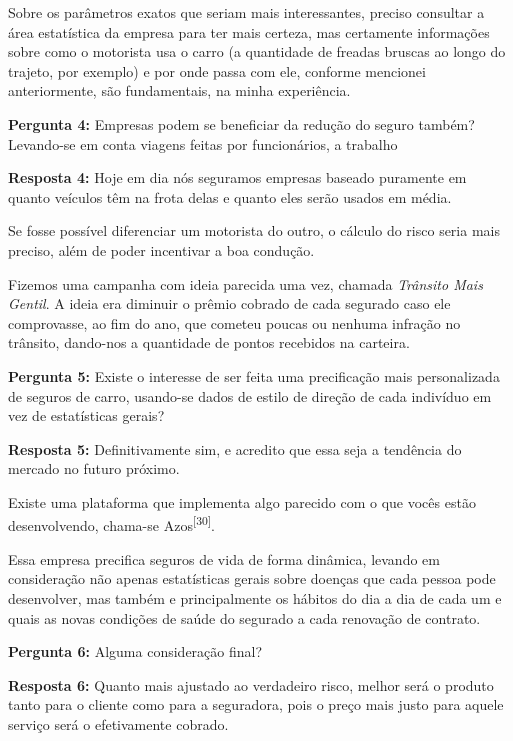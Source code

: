 Sobre os parâmetros exatos que seriam mais interessantes, preciso consultar a área estatística da empresa para ter mais certeza, mas certamente informações sobre como o motorista usa o carro (a quantidade de freadas bruscas ao longo do trajeto, por exemplo) e por onde passa com ele, conforme mencionei anteriormente, são fundamentais, na minha experiência.


\textbf{Pergunta 4:} 
Empresas podem se beneficiar da redução do seguro também? Levando-se em conta viagens feitas por funcionários, a trabalho

\textbf{Resposta 4:}
Hoje em dia nós seguramos empresas baseado puramente em quanto veículos têm na frota delas e quanto eles serão usados em média.

Se fosse possível diferenciar um motorista do outro, o cálculo do risco seria mais preciso, além de poder incentivar a boa condução.

Fizemos uma campanha com ideia parecida uma vez, chamada \textit{Trânsito Mais Gentil}. A ideia era diminuir o prêmio cobrado de cada segurado caso ele comprovasse, ao fim do ano, que cometeu poucas ou nenhuma infração no trânsito, dando-nos a quantidade de pontos recebidos na carteira.

    
\textbf{Pergunta 5:} 
Existe o interesse de ser feita uma precificação mais personalizada de seguros de carro, usando-se dados de estilo de direção de cada indivíduo em vez de estatísticas gerais?

\textbf{Resposta 5:}
Definitivamente sim, e acredito que essa seja a tendência do mercado no futuro próximo.

Existe uma plataforma que implementa algo parecido com o que vocês estão desenvolvendo, chama-se Azos\textsuperscript{[30]}.

Essa empresa precifica seguros de vida de forma dinâmica, levando em consideração não apenas estatísticas gerais sobre doenças que cada pessoa pode desenvolver, mas também e principalmente os hábitos do dia a dia de cada um e quais as novas condições de saúde do segurado a cada renovação de contrato.

    
\textbf{Pergunta 6:} 
Alguma consideração final?
    
\textbf{Resposta 6:} 
Quanto mais ajustado ao verdadeiro risco, melhor será o produto tanto para o cliente como para a seguradora, pois o preço mais justo para aquele serviço será o efetivamente cobrado.

